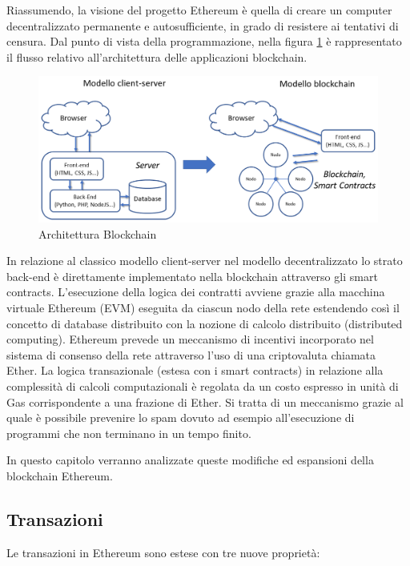 Riassumendo, la visione del progetto Ethereum è quella di creare un computer decentralizzato permanente e autosufficiente, in grado di resistere ai tentativi di censura. Dal punto di vista della programmazione, nella figura \ref{fig:ArchitetturaBlockchain} è rappresentato il flusso relativo all’architettura delle applicazioni blockchain.

\begin{figure}[H]
\centering
\includegraphics[width=1\textwidth]{immagini/archit.png}
\caption{Architettura Blockchain}
\label{fig:ArchitetturaBlockchain}
\end{figure}

In relazione al classico modello client-server nel modello decentralizzato lo strato back-end è direttamente implementato nella blockchain attraverso gli smart contracts. L’esecuzione della logica dei contratti avviene grazie alla macchina virtuale Ethereum (EVM) eseguita da ciascun nodo della rete estendendo così il concetto di database distribuito con la nozione di calcolo distribuito (distributed computing). Ethereum prevede un meccanismo di incentivi incorporato nel sistema di consenso della rete attraverso l’uso di una criptovaluta chiamata Ether. La logica transazionale (estesa con i smart contracts) in relazione alla complessità di calcoli computazionali è regolata da un costo espresso in unità di Gas corrispondente a una frazione di Ether. Si tratta di un meccanismo grazie al quale è possibile prevenire lo spam dovuto ad esempio all’esecuzione di programmi che non terminano in un tempo finito.

In questo capitolo verranno analizzate queste modifiche ed espansioni della blockchain Ethereum.

\subsection{Transazioni}

Le transazioni in Ethereum sono estese con tre nuove proprietà:

